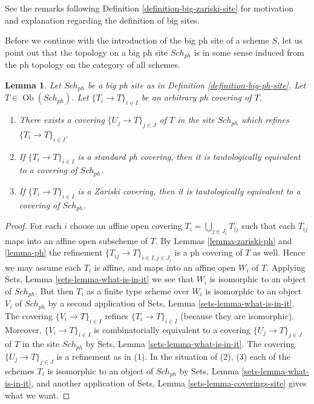 \documentclass{stacks-project}
\theoremstyle{plain}
\newtheorem{lemma}[subsection]{Lemma}
\theoremstyle{definition}
\theoremstyle{remark}
\numberwithin{equation}{subsection}
\def\Sch{\mathit{Sch}}
\def\Ob{\mathop{\mathrm{Ob}}\nolimits}
\begin{document}
\noindent
See the remarks following Definition \ref{definition-big-zariski-site}
for motivation and explanation regarding the definition of big sites.

\medskip\noindent
Before we continue with the introduction of the big ph site of
a scheme $S$, let us point out that the topology on a big ph site
$\Sch_{ph}$ is in some sense induced from the ph topology
on the category of all schemes.

\begin{lemma}
\label{lemma-ph-induced}
Let $\Sch_{ph}$ be a big ph site as in
Definition \ref{definition-big-ph-site}.
Let $T \in \Ob(\Sch_{ph})$.
Let $\{T_i \to T\}_{i \in I}$ be an arbitrary ph covering of $T$.
\begin{enumerate}
\item There exists a covering $\{U_j \to T\}_{j \in J}$ of $T$ in the site
$\Sch_{ph}$ which refines $\{T_i \to T\}_{i \in I}$.
\item If $\{T_i \to T\}_{i \in I}$ is a standard ph covering, then
it is tautologically equivalent to a covering of $\Sch_{ph}$.
\item If $\{T_i \to T\}_{i \in I}$ is a Zariski covering, then
it is tautologically equivalent to a covering of $\Sch_{ph}$.
\end{enumerate}
\end{lemma}

\begin{proof}
For each $i$ choose an affine open covering $T_i = \bigcup_{j \in J_i} T_{ij}$
such that each $T_{ij}$ maps into an affine open subscheme of $T$. By
Lemmas \ref{lemma-zariski-ph} and \ref{lemma-ph}
the refinement $\{T_{ij} \to T\}_{i \in I, j \in J_i}$ is a ph covering
of $T$ as well. Hence we may assume each $T_i$ is affine, and maps into
an affine open $W_i$ of $T$. Applying
Sets, Lemma \ref{sets-lemma-what-is-in-it}
we see that $W_i$ is isomorphic to an object of $\Sch_{ph}$.
But then $T_i$ as a finite type scheme over $W_i$
is isomorphic to an object $V_i$ of $\Sch_{ph}$ by a second
application of
Sets, Lemma \ref{sets-lemma-what-is-in-it}.
The covering $\{V_i \to T\}_{i \in I}$ refines $\{T_i \to T\}_{i \in I}$
(because they are isomorphic).
Moreover, $\{V_i \to T\}_{i \in I}$ is combinatorially equivalent to a
covering $\{U_j \to T\}_{j \in J}$ of $T$ in the site
$\Sch_{ph}$ by
Sets, Lemma \ref{sets-lemma-what-is-in-it}.
The covering $\{U_j \to T\}_{j \in J}$ is a refinement as in (1).
In the situation of (2), (3) each of the
schemes $T_i$ is isomorphic to an object of $\Sch_{ph}$ by
Sets, Lemma \ref{sets-lemma-what-is-in-it},
and another application of
Sets, Lemma \ref{sets-lemma-coverings-site}
gives what we want.
\end{proof}
\end{document}

